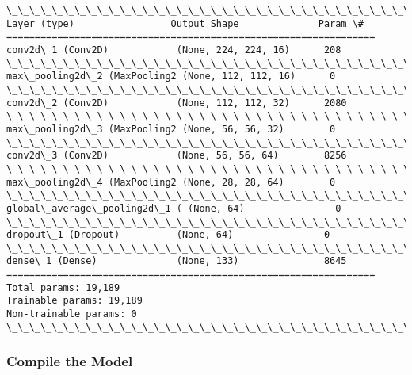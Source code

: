 \documentclass[11pt]{article}
\begin{document}
    \begin{Verbatim}[commandchars=\\\{\}]
\_\_\_\_\_\_\_\_\_\_\_\_\_\_\_\_\_\_\_\_\_\_\_\_\_\_\_\_\_\_\_\_\_\_\_\_\_\_\_\_\_\_\_\_\_\_\_\_\_\_\_\_\_\_\_\_\_\_\_\_\_\_\_\_\_
Layer (type)                 Output Shape              Param \#   
=================================================================
conv2d\_1 (Conv2D)            (None, 224, 224, 16)      208       
\_\_\_\_\_\_\_\_\_\_\_\_\_\_\_\_\_\_\_\_\_\_\_\_\_\_\_\_\_\_\_\_\_\_\_\_\_\_\_\_\_\_\_\_\_\_\_\_\_\_\_\_\_\_\_\_\_\_\_\_\_\_\_\_\_
max\_pooling2d\_2 (MaxPooling2 (None, 112, 112, 16)      0         
\_\_\_\_\_\_\_\_\_\_\_\_\_\_\_\_\_\_\_\_\_\_\_\_\_\_\_\_\_\_\_\_\_\_\_\_\_\_\_\_\_\_\_\_\_\_\_\_\_\_\_\_\_\_\_\_\_\_\_\_\_\_\_\_\_
conv2d\_2 (Conv2D)            (None, 112, 112, 32)      2080      
\_\_\_\_\_\_\_\_\_\_\_\_\_\_\_\_\_\_\_\_\_\_\_\_\_\_\_\_\_\_\_\_\_\_\_\_\_\_\_\_\_\_\_\_\_\_\_\_\_\_\_\_\_\_\_\_\_\_\_\_\_\_\_\_\_
max\_pooling2d\_3 (MaxPooling2 (None, 56, 56, 32)        0         
\_\_\_\_\_\_\_\_\_\_\_\_\_\_\_\_\_\_\_\_\_\_\_\_\_\_\_\_\_\_\_\_\_\_\_\_\_\_\_\_\_\_\_\_\_\_\_\_\_\_\_\_\_\_\_\_\_\_\_\_\_\_\_\_\_
conv2d\_3 (Conv2D)            (None, 56, 56, 64)        8256      
\_\_\_\_\_\_\_\_\_\_\_\_\_\_\_\_\_\_\_\_\_\_\_\_\_\_\_\_\_\_\_\_\_\_\_\_\_\_\_\_\_\_\_\_\_\_\_\_\_\_\_\_\_\_\_\_\_\_\_\_\_\_\_\_\_
max\_pooling2d\_4 (MaxPooling2 (None, 28, 28, 64)        0         
\_\_\_\_\_\_\_\_\_\_\_\_\_\_\_\_\_\_\_\_\_\_\_\_\_\_\_\_\_\_\_\_\_\_\_\_\_\_\_\_\_\_\_\_\_\_\_\_\_\_\_\_\_\_\_\_\_\_\_\_\_\_\_\_\_
global\_average\_pooling2d\_1 ( (None, 64)                0         
\_\_\_\_\_\_\_\_\_\_\_\_\_\_\_\_\_\_\_\_\_\_\_\_\_\_\_\_\_\_\_\_\_\_\_\_\_\_\_\_\_\_\_\_\_\_\_\_\_\_\_\_\_\_\_\_\_\_\_\_\_\_\_\_\_
dropout\_1 (Dropout)          (None, 64)                0         
\_\_\_\_\_\_\_\_\_\_\_\_\_\_\_\_\_\_\_\_\_\_\_\_\_\_\_\_\_\_\_\_\_\_\_\_\_\_\_\_\_\_\_\_\_\_\_\_\_\_\_\_\_\_\_\_\_\_\_\_\_\_\_\_\_
dense\_1 (Dense)              (None, 133)               8645      
=================================================================
Total params: 19,189
Trainable params: 19,189
Non-trainable params: 0
\_\_\_\_\_\_\_\_\_\_\_\_\_\_\_\_\_\_\_\_\_\_\_\_\_\_\_\_\_\_\_\_\_\_\_\_\_\_\_\_\_\_\_\_\_\_\_\_\_\_\_\_\_\_\_\_\_\_\_\_\_\_\_\_\_

    \end{Verbatim}

    \hypertarget{compile-the-model}{%
\subsubsection{Compile the Model}\label{compile-the-model}}
\end{document}
